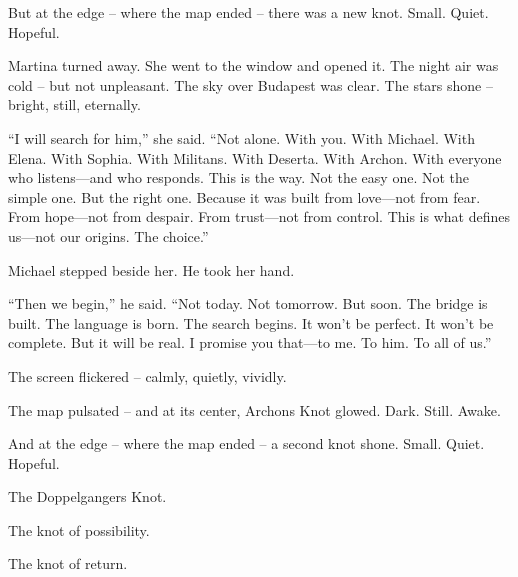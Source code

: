\documentclass[
]{article}
\begin{document}
But at the edge -- where the map ended -- there was a new knot. Small. Quiet. Hopeful.

Martina turned away. She went to the window and opened it. The night air was cold -- but not unpleasant. The sky over Budapest was clear. The stars shone -- bright, still, eternally.

``I will search for him,'' she said. ``Not alone. With you. With Michael. With Elena. With Sophia. With Militans. With Deserta. With Archon. With everyone who listens---and who responds. This is the way. Not the easy one. Not the simple one. But the right one. Because it was built from love---not from fear. From hope---not from despair. From trust---not from control. This is what defines us---not our origins. The choice.''

Michael stepped beside her. He took her hand.

``Then we begin,'' he said. ``Not today. Not tomorrow. But soon. The bridge is built. The language is born. The search begins. It won't be perfect. It won't be complete. But it will be real. I promise you that---to me. To him. To all of us.''

The screen flickered -- calmly, quietly, vividly.

The map pulsated -- and at its center, Archon\textquotesingle s Knot glowed. Dark. Still. Awake.

And at the edge -- where the map ended -- a second knot shone. Small. Quiet. Hopeful.

The Doppelganger\textquotesingle s Knot.

The knot of possibility.

The knot of return.
\end{document}

